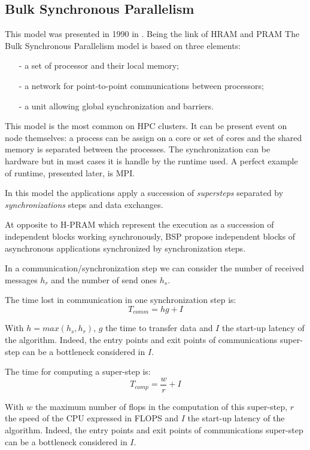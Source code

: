 \subsection{Bulk Synchronous Parallelism }
This model was presented in 1990 in \cite{valiant1990bridging}.
Being the link of HRAM and PRAM 
The Bulk Synchronous Parallelism model is based on three elements:
\begin{itemize}[noitemsep,nolistsep]
  \item[-] a set of processor and their local memory;
  \item[-] a network for point-to-point communications between processors;
  \item[-] a unit allowing global synchronization and barriers.
\end{itemize}
This model is the most common on HPC clusters. 
It can be present event on node themselves: a process can be assign on a core or set of cores and the shared memory is separated between the processes. 
The synchronization can be hardware but in most cases it is handle by the runtime used.
A perfect example of runtime, presented later, is MPI. 

In this model the applications apply a succession of \textit{supersteps} separated by \textit{synchronizations} steps and data exchanges.

At opposite to H-PRAM which represent the execution as a succession of independent blocks working synchronously, BSP propose independent blocks of asynchronous applications synchronized by synchronization steps. 

In a communication/synchronization step we can consider the number of received messages $h_r$ and the number of send ones $h_s$.

The time lost in communication in one synchronization step is:
\begin{equation}
  T_{comm} = hg + I
\end{equation}

With $h = max(h_s,h_r)$, $g$ the time to transfer data and $I$ the start-up latency of the algorithm.
Indeed, the entry points and exit points of communications super-step can be a bottleneck considered in $I$.

The time for computing a super-step is: 
\begin{equation}
  T_{comp} = \frac{w}{r} + I
\end{equation}

With $w$ the maximum number of flops in the computation of this super-step, $r$ the speed of the CPU expressed in FLOPS and $I$ the start-up latency of the algorithm.
Indeed, the entry points and exit points of communications super-step can be a bottleneck considered in $I$.


